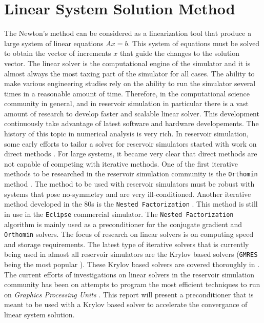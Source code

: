 \section{Linear System Solution Method}
The Newton's method can be considered as a linearization tool that produce a large system of linear equations $Ax = b$.
This system of equations must be solved to obtain the vector of increments $x$ that guide the changes to the solution vector.
The linear solver is the computational engine of the simulator and it is almost always the most taxing part of the simulator
for all cases. The ability to make various engineering studies rely on the ability to run the simulator several times in a 
reasonable amount of time. Therefore, in the computational science community in general, and in reservoir simulation in particular 
there is a vast amount of research to develop faster and scalable linear solver. This development continuously take advantage of
latest software and hardware developements. The history of this topic in numerical analysis is very rich. In reservoir simulation,
some early efforts to tailor a solver for reservoir simulators started with work on direct methods \cite{direct}.
For large systems, it became very clear that direct methods are not capable of competing with iterative methods.
One of the first iterative methods to be researched in the reservoir simulation community is the \texttt{Orthomin} method \cite{orthomin}.
The method to be used with reservoir simulators must be robust with systems that pose no-symmetry and are very ill-conditioned.
Another iterative method developed in the 80s is the \texttt{Nested Factorization} \cite{nested}. This method is still in use in the 
\texttt{Eclipse} commercial simulator. The \texttt{Nested Factorization} algorithm is mainly used as a preconditioner for the conjugate gradient
and \texttt{Orthomin} solvers. The focus of research on linear solvers is on computing speed and storage requirements. 
The latest type of iterative solvers that is currently being used in almost all reservoir simulators are the Krylov based solvers (\texttt{GMRES} being the most popular \cite{gmres}).
These Krylov based solvers are covered thoroughly in \cite{saad}. The current efforts of investigations on linear solvers in the reservoir simulation community
has been on attempts to program the most efficient techniques to run on \textit{Graphics Processing Units} \cite{appleyardgpu, gpunested}.
This report will present a preconditioner that is meant to be used with a Krylov based solver to accelerate the convergance of linear system solution.

